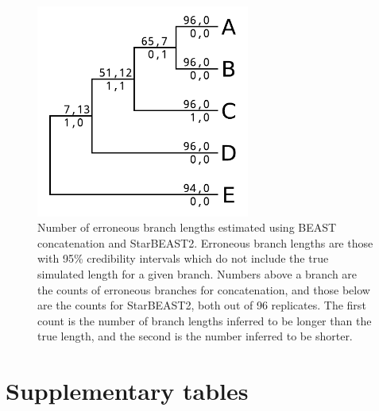 \documentclass[12pt]{article}
\begin{document}
\begin{figure}[htb!]
\centering
\includegraphics[width=7cm]{false_branch_lengths.pdf}
\caption
{Number of erroneous branch lengths estimated using BEAST concatenation and StarBEAST2. Erroneous
branch lengths are those with 95\% credibility intervals which do not include the true simulated length for a given branch.
Numbers above a branch are the counts of erroneous branches for concatenation, and those
below are the counts for StarBEAST2, both out of 96 replicates. The first count is
the number of branch lengths inferred to be longer than the true length, and the
second is the number inferred to be shorter.}
\label{fig:spilsBranchLengths}
\end{figure}

\clearpage

\section{Supplementary tables}
\end{document}
